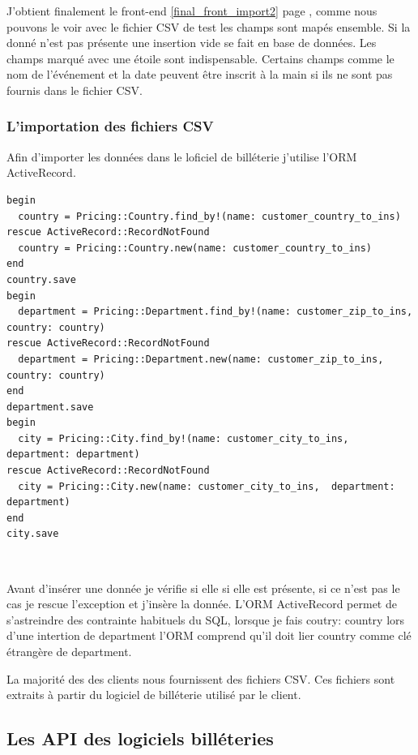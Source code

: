J'obtient finalement le front-end \ref{final_front_import2} page \pageref{final_front_import2}, comme nous pouvons le voir avec le fichier CSV de test les champs sont mapés ensemble. Si la donné n'est pas présente une insertion vide se fait en base de données. Les champs marqué avec une étoile sont indispensable. Certains champs comme le nom de l'événement et la date peuvent être inscrit à la main si ils ne sont pas fournis dans le fichier CSV.


\subsubsection{L'importation des fichiers CSV}

Afin d'importer les données dans le loficiel de billéterie j'utilise l'ORM ActiveRecord.

\lstset{style=customruby}
\begin{lstlisting}
begin
  country = Pricing::Country.find_by!(name: customer_country_to_ins)
rescue ActiveRecord::RecordNotFound 
  country = Pricing::Country.new(name: customer_country_to_ins)
end
country.save
begin
  department = Pricing::Department.find_by!(name: customer_zip_to_ins, country: country)
rescue ActiveRecord::RecordNotFound
  department = Pricing::Department.new(name: customer_zip_to_ins,  country: country)
end
department.save
begin
  city = Pricing::City.find_by!(name: customer_city_to_ins, department: department)
rescue ActiveRecord::RecordNotFound
  city = Pricing::City.new(name: customer_city_to_ins,  department: department)
end
city.save
\end{lstlisting}
\leavevmode \

Avant d'insérer une donnée je vérifie si elle si elle est présente, si ce n'est pas le cas je rescue l'exception et j'insère la donnée. 
L'ORM ActiveRecord permet de s'astreindre des contrainte habituels du SQL, lorsque je fais coutry: country lors d'une intertion de department l'ORM comprend qu'il doit lier country comme clé étrangère de department.

La majorité des des clients nous fournissent des fichiers CSV. Ces fichiers sont extraits à partir du logiciel de billéterie utilisé par le client.


\subsection{Les API des logiciels billéteries}

















